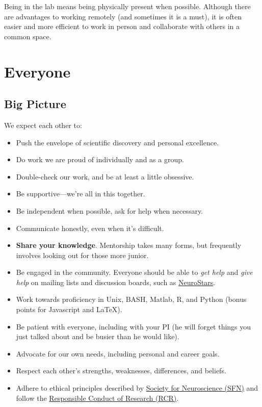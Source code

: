 \documentclass[letterpaper,11pt,oneside]{memoir}
\begin{document}
\begin{shaded}
\noindent Being in the lab means being physically present when possible. Although there are advantages to working remotely (and sometimes it is a must), it is often easier and more efficient to work in person and collaborate with others in a common space.
\end{shaded}


\section{Everyone}

\subsection{Big Picture}

We expect each other to:

\begin{itemize}
\item Push the envelope of scientific discovery and personal excellence. 
\item Do work we are proud of individually and as a group.
\item Double-check our work, and be at least a little obsessive.
\item Be supportive---we're all in this together.
\item Be independent when possible, ask for help when necessary.
\item Communicate honestly, even when it's difficult.
\item \textbf{Share your knowledge}. Mentorship takes many forms, but frequently involves looking out for those more junior.
\item Be engaged in the community. Everyone should be able to \textit{get help} and \textit{give help} on mailing lists and discussion boards, such as \href{https://neurostars.org}{NeuroStars}.
\item Work towards proficiency in Unix, BASH, Matlab, R, and Python (bonus points for Javascript and \LaTeX).
\item Be patient with everyone, including with your PI (he will forget things you just talked about and be busier than he would like).
\item Advocate for our own needs, including personal and career goals.
\item Respect each other's strengths, weaknesses, differences, and beliefs.
\item Adhere to ethical principles described by \href{https://www.sfn.org/about/professional-conduct/sfn-ethics-policy}{Society for Neuroscience (SFN)} and follow the \href{https://ori.hhs.gov/ori-introduction-responsible-conduct-research}{Responsible Conduct of Research (RCR)}. 
\end{itemize}
\end{document}
